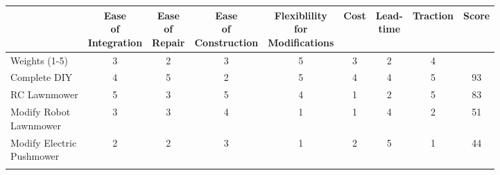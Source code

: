 \documentclass{article}
\begin{document}
		\begin{table}[H]
		\begin{adjustwidth}{-1.5in}{-1.5in}
		\centering
		\setlength{\dashlinedash}{.4pt}
		\setlength\tabcolsep{4pt}


		\begin{tabular}{|l|c|c|c|c|c|c|c|c|}
		\hline
		            & \makecell{Ease \\ of \\ Integration} & \makecell{Ease \\ of \\ Repair} & \makecell{Ease \\ of \\ Construction} & \makecell{Flexiblility \\ for \\ Modifications} & Cost & \makecell{Lead- \\ time} & Traction & Score \\ \hline
		Weights (1-5)                      & 3                   & 2              & 3                    & 5                              & 3    & 2        & 4        &       \\ \hline
		\multicolumn{1}{|l|}{\cellcolor{highlight}Complete DIY} & \multicolumn{1}{c|}{\cellcolor{highlight}4}                   & \multicolumn{1}{c|}{\cellcolor{highlight}5}              & \multicolumn{1}{c|}{\cellcolor{highlight}2}                    & \multicolumn{1}{c|}{\cellcolor{highlight}5}                              & \multicolumn{1}{c|}{\cellcolor{highlight}4}    & \multicolumn{1}{c|}{\cellcolor{highlight}4}        & \multicolumn{1}{c|}{\cellcolor{highlight}5}        & \multicolumn{1}{c|}{\cellcolor{highlight}93}    \\ \hdashline
		RC Lawnmower                       & 5                   & 3              & 5                    & 4                              & 1    & 2        & 5        & 83    \\ \hdashline
		\makecell[l]{Modify Robot \\ Lawnmower}           & 3                   & 3              & 4                    & 1                              & 1    & 4        & 2        & 51    \\ \hdashline
		\makecell[l]{Modify Electric \\ Pushmower}         & 2                   & 2              & 3                    & 1                              & 2    & 5        & 1        & 44    \\ \hdashline

\end{tabular}
\end{adjustwidth}
\end{table}
\end{document}
